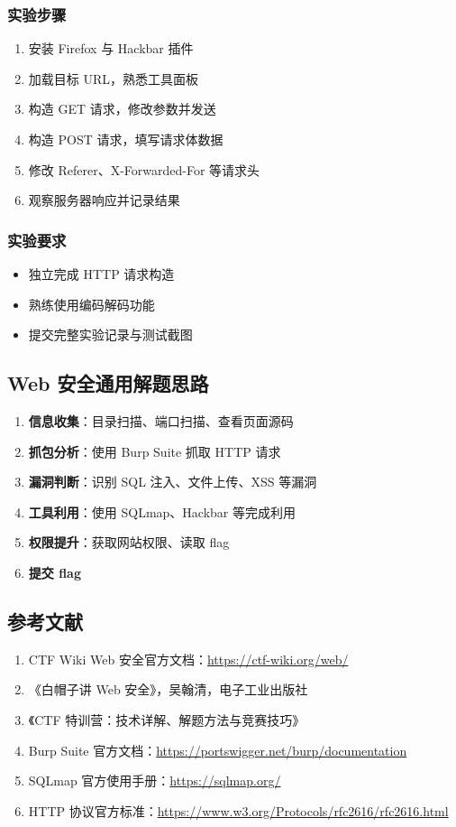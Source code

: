 \subsubsection{实验步骤}
\begin{enumerate}[leftmargin=*]
    \item 安装 Firefox 与 Hackbar 插件
    \item 加载目标 URL，熟悉工具面板
    \item 构造 GET 请求，修改参数并发送
    \item 构造 POST 请求，填写请求体数据
    \item 修改 Referer、X-Forwarded-For 等请求头
    \item 观察服务器响应并记录结果
\end{enumerate}

\subsubsection{实验要求}
\begin{itemize}[leftmargin=*]
    \item 独立完成 HTTP 请求构造
    \item 熟练使用编码解码功能
    \item 提交完整实验记录与测试截图
\end{itemize}

\newpage
\subsection{Web 安全通用解题思路}
\begin{enumerate}[leftmargin=*]
    \item \textbf{信息收集}：目录扫描、端口扫描、查看页面源码
    \item \textbf{抓包分析}：使用 Burp Suite 抓取 HTTP 请求
    \item \textbf{漏洞判断}：识别 SQL 注入、文件上传、XSS 等漏洞
    \item \textbf{工具利用}：使用 SQLmap、Hackbar 等完成利用
    \item \textbf{权限提升}：获取网站权限、读取 flag
    \item \textbf{提交 flag}
\end{enumerate}

\newpage
\subsection{参考文献}
\begin{enumerate}[leftmargin=*]
    \item CTF Wiki Web 安全官方文档：\url{https://ctf-wiki.org/web/}
    \item 《白帽子讲 Web 安全》，吴翰清，电子工业出版社
    \item 《CTF 特训营：技术详解、解题方法与竞赛技巧》
    \item Burp Suite 官方文档：\url{https://portswigger.net/burp/documentation}
    \item SQLmap 官方使用手册：\url{https://sqlmap.org/}
    \item HTTP 协议官方标准：\url{https://www.w3.org/Protocols/rfc2616/rfc2616.html}
\end{enumerate}